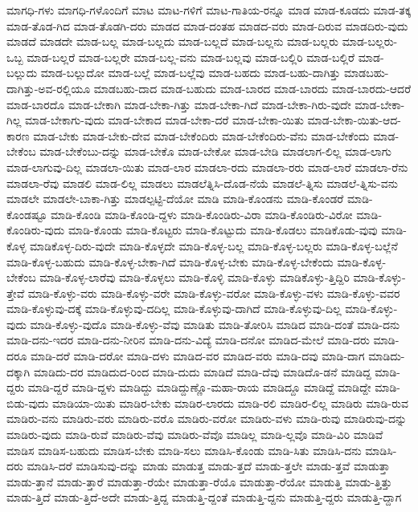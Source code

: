 {ಮಾಗಧಿ-ಗಳು
ಮಾಗಧಿ-ಗಳೊಂದಿಗೆ
ಮಾಟ
ಮಾಟ-ಗಳಿಗೆ
ಮಾಟ-ಗಾತಿಯ-ರನ್ನೂ
ಮಾಡ
ಮಾಡ-ಕೂಡದು
ಮಾಡ-ತಕ್ಕ
ಮಾಡ-ತೊಡ-ಗಿದ
ಮಾಡ-ತೊಡಗಿ-ದರು
ಮಾಡದ
ಮಾಡ-ದಂತಹ
ಮಾಡದ-ವರು
ಮಾಡ-ದಿರುವ
ಮಾಡದಿರು-ವುದು
ಮಾಡದೆ
ಮಾಡದೇ
ಮಾಡ-ಬಲ್ಲ
ಮಾಡ-ಬಲ್ಲದು
ಮಾಡ-ಬಲ್ಲದೆ
ಮಾಡ-ಬಲ್ಲನು
ಮಾಡ-ಬಲ್ಲರು
ಮಾಡ-ಬಲ್ಲರು-ಒಬ್ಬ
ಮಾಡ-ಬಲ್ಲರೆ
ಮಾಡ-ಬಲ್ಲರೇ
ಮಾಡ-ಬಲ್ಲ-ವನು
ಮಾಡ-ಬಲ್ಲವು
ಮಾಡ-ಬಲ್ಲಿರಿ
ಮಾಡ-ಬಲ್ಲಿರೆ
ಮಾಡ-ಬಲ್ಲುದು
ಮಾಡ-ಬಲ್ಲುದೋ
ಮಾಡ-ಬಲ್ಲೆ
ಮಾಡ-ಬಲ್ಲೆವು
ಮಾಡ-ಬಹದು
ಮಾಡ-ಬಹು-ದಾಗಿತ್ತು
ಮಾಡಬಹು-ದಾಗಿತ್ತು-ಅವ-ರಲ್ಲಿಯೂ
ಮಾಡಬಹು-ದಾದ
ಮಾಡ-ಬಹುದು
ಮಾಡ-ಬಾರದ
ಮಾಡ-ಬಾರದು
ಮಾಡ-ಬಾರದು-ಆದರೆ
ಮಾಡ-ಬಾರದೊ
ಮಾಡ-ಬೇಕಾಗಿ
ಮಾಡ-ಬೇಕಾ-ಗಿತ್ತು
ಮಾಡ-ಬೇಕಾ-ಗಿದೆ
ಮಾಡ-ಬೇಕಾ-ಗಿರು-ವುದೇ
ಮಾಡ-ಬೇಕಾ-ಗಿಲ್ಲ
ಮಾಡ-ಬೇಕಾಗು-ವುದು
ಮಾಡ-ಬೇಕಾದ
ಮಾಡ-ಬೇಕಾ-ದರೆ
ಮಾಡ-ಬೇಕಾ-ಯಿತು
ಮಾಡ-ಬೇಕಾ-ಯಿತು-ಆದ-ಕಾರಣ
ಮಾಡ-ಬೇಕು
ಮಾಡ-ಬೇಕು-ದೇವ
ಮಾಡ-ಬೇಕೆಂದಿರು
ಮಾಡ-ಬೇಕೆಂದಿರು-ವೆನು
ಮಾಡ-ಬೇಕೆಂದು
ಮಾಡ-ಬೇಕೆಂಬ
ಮಾಡ-ಬೇಕೆಂಬು-ದನ್ನು
ಮಾಡ-ಬೇಕೊ
ಮಾಡ-ಬೇಕೋ
ಮಾಡ-ಬೇಡಿ
ಮಾಡಲಾಗ-ಲಿಲ್ಲ
ಮಾಡ-ಲಾಗು
ಮಾಡ-ಲಾಗುವು-ದಿಲ್ಲ
ಮಾಡಲಾ-ಯಿತು
ಮಾಡ-ಲಾರ
ಮಾಡಲಾ-ರದು
ಮಾಡಲಾ-ರರು
ಮಾಡ-ಲಾರೆ
ಮಾಡಲಾ-ರೆನು
ಮಾಡಲಾ-ರೆವು
ಮಾಡಲಿ
ಮಾಡ-ಲಿಲ್ಲ
ಮಾಡಲು
ಮಾಡಲೆತ್ನಿಸಿ-ದೊಡ-ನೆಯೆ
ಮಾಡಲೆ-ತ್ನಿಸು
ಮಾಡಲೆ-ತ್ನಿಸು-ವನು
ಮಾಡಲೇ
ಮಾಡಲೇ-ಬಾಕಾ-ಗಿತ್ತು
ಮಾಡಲ್ಪಟ್ಟಿ-ದೆಯೋ
ಮಾಡಿ
ಮಾಡಿ-ಕೊಂಡನು
ಮಾಡಿ-ಕೊಂಡರೆ
ಮಾಡಿ-ಕೊಂಡಷ್ಟೂ
ಮಾಡಿ-ಕೊಂಡಿ
ಮಾಡಿ-ಕೊಂಡಿ-ದ್ದಳು
ಮಾಡಿ-ಕೊಂಡಿರು-ವಿರಾ
ಮಾಡಿ-ಕೊಂಡಿರು-ವಿರೋ
ಮಾಡಿ-ಕೊಂಡಿರು-ವುದು
ಮಾಡಿ-ಕೊಂಡು
ಮಾಡಿ-ಕೊಟ್ಟರು
ಮಾಡಿ-ಕೊಟ್ಟುದು
ಮಾಡಿ-ಕೊಡಲು
ಮಾಡಿಕೊಡು-ವುವು
ಮಾಡಿ-ಕೊಳ್ಳ
ಮಾಡಿಕೊಳ್ಳ-ದಿರು-ವುದೇ
ಮಾಡಿ-ಕೊಳ್ಳದೇ
ಮಾಡಿ-ಕೊಳ್ಳ-ಬಲ್ಲ
ಮಾಡಿ-ಕೊಳ್ಳ-ಬಲ್ಲರು
ಮಾಡಿ-ಕೊಳ್ಳ-ಬಲ್ಲೆನೆ
ಮಾಡಿ-ಕೊಳ್ಳ-ಬಹುದು
ಮಾಡಿ-ಕೊಳ್ಳ-ಬೇಕಾ-ಗಿದೆ
ಮಾಡಿ-ಕೊಳ್ಳ-ಬೇಕು
ಮಾಡಿ-ಕೊಳ್ಳ-ಬೇಕೆಂದು
ಮಾಡಿ-ಕೊಳ್ಳ-ಬೇಕೆಂಬ
ಮಾಡಿ-ಕೊಳ್ಳ-ಲಾರೆವು
ಮಾಡಿ-ಕೊಳ್ಳಲು
ಮಾಡಿ-ಕೊಳ್ಳಿ
ಮಾಡಿ-ಕೊಳ್ಳು
ಮಾಡಿಕೊಳ್ಳು-ತ್ತಿದ್ದಿರಿ
ಮಾಡಿ-ಕೊಳ್ಳು-ತ್ತೇವೆ
ಮಾಡಿ-ಕೊಳ್ಳು-ವರು
ಮಾಡಿ-ಕೊಳ್ಳು-ವರೇ
ಮಾಡಿ-ಕೊಳ್ಳು-ವರೋ
ಮಾಡಿ-ಕೊಳ್ಳು-ವಳು
ಮಾಡಿ-ಕೊಳ್ಳು-ವವರ
ಮಾಡಿ-ಕೊಳ್ಳುವು-ದಕ್ಕೆ
ಮಾಡಿ-ಕೊಳ್ಳುವು-ದದಿಲ್ಲ
ಮಾಡಿ-ಕೊಳ್ಳುವು-ದಾಗಿದೆ
ಮಾಡಿ-ಕೊಳ್ಳುವು-ದಿಲ್ಲ
ಮಾಡಿ-ಕೊಳ್ಳು-ವುದು
ಮಾಡಿ-ಕೊಳ್ಳು-ವುದೊ
ಮಾಡಿ-ಕೊಳ್ಳು-ವೆವು
ಮಾಡಿತು
ಮಾಡಿ-ತೋರಿಸಿ
ಮಾಡಿದ
ಮಾಡಿ-ದಂತೆ
ಮಾಡಿ-ದನು
ಮಾಡಿ-ದನು-ಇದರ
ಮಾಡಿ-ದನು-ನೀರಿನ
ಮಾಡಿ-ದನು-ವಿದ್ಯೆ
ಮಾಡಿ-ದನೋ
ಮಾಡಿದ-ಮೇಲೆ
ಮಾಡಿ-ದರು
ಮಾಡಿ-ದರೂ
ಮಾಡಿ-ದರೆ
ಮಾಡಿ-ದರೋ
ಮಾಡಿ-ದಳು
ಮಾಡಿದ-ವರ
ಮಾಡಿದ-ವರು
ಮಾಡಿ-ದವು
ಮಾಡಿ-ದಾಗ
ಮಾಡಿದು-ದಕ್ಕಾಗಿ
ಮಾಡಿದು-ದರ
ಮಾಡಿದುದ-ರಿಂದ
ಮಾಡಿ-ದುದು
ಮಾಡಿದೆ
ಮಾಡಿ-ದೆವು
ಮಾಡಿದೊ-ಡನೆ
ಮಾಡಿದ್ದ
ಮಾಡಿ-ದ್ದರು
ಮಾಡಿ-ದ್ದರೆ
ಮಾಡಿ-ದ್ದಳು
ಮಾಡಿದ್ದು
ಮಾಡಿದ್ದುಣ್ಣೊ-ಮಹಾ-ರಾಯ
ಮಾಡಿದ್ದೂ
ಮಾಡಿದ್ದೆ
ಮಾಡಿದ್ದೇ
ಮಾಡಿ-ಬಿಡು-ವುದು
ಮಾಡಿಯಾ-ಯಿತು
ಮಾಡಿರ-ಬೇಕು
ಮಾಡಿರ-ಲಾರದು
ಮಾಡಿ-ರಲಿ
ಮಾಡಿರ-ಲಿಲ್ಲ
ಮಾಡಿರು
ಮಾಡಿ-ರುವ
ಮಾಡಿರು-ವನು
ಮಾಡಿರು-ವರು
ಮಾಡಿರು-ವರೊ
ಮಾಡಿರು-ವರೋ
ಮಾಡಿರು-ವಳು
ಮಾಡಿ-ರುವು
ಮಾಡಿರುವು-ದನ್ನು
ಮಾಡಿರು-ವುದು
ಮಾಡಿ-ರುವೆ
ಮಾಡಿರು-ವೆವು
ಮಾಡಿರು-ವೆವೊ
ಮಾಡಿಲ್ಲ
ಮಾಡಿ-ಲ್ಲವೊ
ಮಾಡಿ-ವಿರಿ
ಮಾಡಿವೆ
ಮಾಡಿಸ
ಮಾಡಿಸ-ಬಹುದು
ಮಾಡಿಸ-ಬೇಕು
ಮಾಡಿ-ಸಲು
ಮಾಡಿಸಿ-ಕೊಂಡು
ಮಾಡಿ-ಸಿತು
ಮಾಡಿಸಿ-ದನು
ಮಾಡಿಸಿ-ದರು
ಮಾಡಿಸಿ-ದರೆ
ಮಾಡಿಸುವು-ದನ್ನು
ಮಾಡು
ಮಾಡುತ್ತ
ಮಾಡು-ತ್ತದೆ
ಮಾಡು-ತ್ತಲೇ
ಮಾಡು-ತ್ತವೆ
ಮಾಡುತ್ತಾ
ಮಾಡು-ತ್ತಾನೆ
ಮಾಡು-ತ್ತಾರೆ
ಮಾಡುತ್ತಾ-ರೆಯೇ
ಮಾಡುತ್ತಾ-ರೆಯೊ
ಮಾಡುತ್ತಾ-ರೆಯೋ
ಮಾಡುತ್ತಿ
ಮಾಡು-ತ್ತಿತ್ತು
ಮಾಡು-ತ್ತಿದೆ
ಮಾಡು-ತ್ತಿದೆ-ಅದೇ
ಮಾಡು-ತ್ತಿದ್ದ
ಮಾಡುತ್ತಿ-ದ್ದಂತೆ
ಮಾಡುತ್ತಿ-ದ್ದನು
ಮಾಡುತ್ತಿ-ದ್ದರು
ಮಾಡುತ್ತಿ-ದ್ದಾಗ
}
